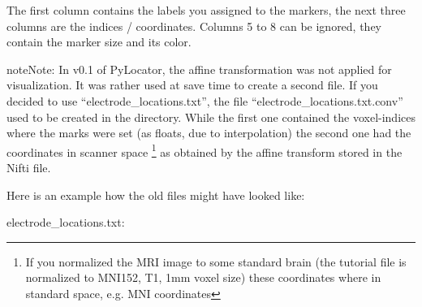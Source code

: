 \documentclass[letterpaper,10pt,english]{sphinxmanual}
\begin{document}
The first column contains the labels you assigned to the markers, the next
three columns are the indices / coordinates. Columns 5 to 8 can be ignored,
they contain the marker size and its color.

\begin{notice}{note}{Note:}
In v0.1 of PyLocator, the affine transformation was not applied for visualization.
It was rather used at save time to create a second file. If you decided to use
``electrode\_locations.txt'', the file ``electrode\_locations.txt.conv'' used to be created in the directory.
While the first one contained the voxel-indices where the marks were set (as floats, due to
interpolation) the second one had the coordinates in scanner space \footnote{
If you normalized the MRI image to some standard brain (the tutorial file is normalized to MNI152, T1, 1mm voxel size)
these coordinates where in standard space, e.g. MNI coordinates
} as obtained by the affine
transform stored in the Nifti file.

Here is an example how the old files might have looked like:

electrode\_locations.txt:


\end{notice}
\end{document}
